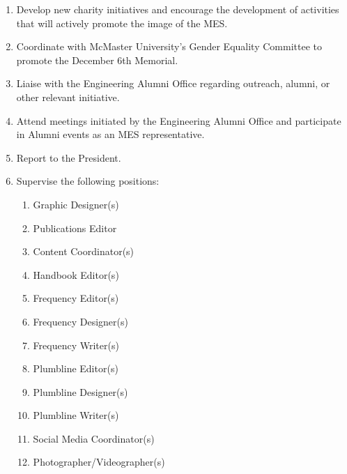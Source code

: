 \begin{enumerate}
  \begin{enumerate}
   \item
    Faculty of Engineering Open Houses
   \item
    MES charity events
  \end{enumerate}
 \item
  Develop new charity initiatives and encourage the development of activities that will actively promote the image of the MES.
 \item
  Coordinate with McMaster University's Gender Equality Committee to promote the December 6th Memorial.
 \item
  Liaise with the Engineering Alumni Office regarding outreach, alumni, or other relevant initiative.
 \item
  Attend meetings initiated by the Engineering Alumni Office and participate in Alumni events as an MES representative.
 \item
  Report to the President.
 \item
  Supervise the following positions:

  \begin{enumerate}
   \item
    Graphic Designer(s)
   \item
    Publications Editor
   \item
    Content Coordinator(s)
   \item
    Handbook Editor(s)
   \item
    Frequency Editor(s)
   \item   
    Frequency Designer(s) 
   \item    
    Frequency Writer(s) 
   \item
    Plumbline Editor(s)
   \item
    Plumbline Designer(s) 
   \item     
    Plumbline Writer(s) 
   \item     
    Social Media Coordinator(s)
   \item
    Photographer/Videographer(s)
  \end{enumerate}

\end{enumerate}